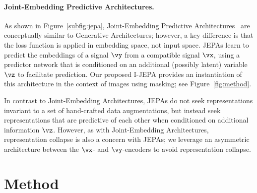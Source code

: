 \documentclass[10pt,twocolumn,letterpaper]{article}
\newcommand{\putalg}{{I-JEPA}\xspace}
\begin{document}
\paragraph{Joint-Embedding Predictive Architectures.}
As shown in Figure~\ref{subfig:jepa}, Joint-Embedding Predictive Architectures~\cite{lecun2022path} are conceptually similar to Generative Architectures; however, a key difference is that the loss function is applied in embedding space, not input space.
JEPAs learn to predict the embeddings of a signal $\vy$ from a compatible signal $\vx$, using a predictor network that is conditioned on an additional (possibly latent) variable $\vz$ to facilitate prediction.
Our proposed \putalg provides an instantiation of this architecture in the context of images using masking; see Figure~\ref{fig:method}.

In contrast to Joint-Embedding Architectures, JEPAs do not seek representations invariant to a set of hand-crafted data augmentations, but instead seek representations that are predictive of each other when conditioned on additional information $\vz$.
However, as with Joint-Embedding Architectures, representation collapse is also a concern with JEPAs; we leverage an asymmetric architecture between the $\vx$- and $\vy$-encoders to avoid representation collapse.

\section{Method}
\label{sec:method}
\end{document}
